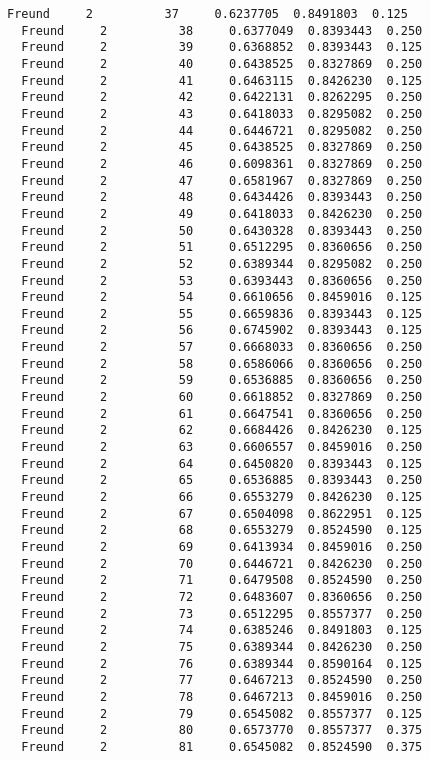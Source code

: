 \documentclass[11pt]{article}
\begin{document}
\begin{Verbatim}[commandchars=\\\{\}]
  Freund     2          37     0.6237705  0.8491803  0.125
  Freund     2          38     0.6377049  0.8393443  0.250
  Freund     2          39     0.6368852  0.8393443  0.125
  Freund     2          40     0.6438525  0.8327869  0.250
  Freund     2          41     0.6463115  0.8426230  0.125
  Freund     2          42     0.6422131  0.8262295  0.250
  Freund     2          43     0.6418033  0.8295082  0.250
  Freund     2          44     0.6446721  0.8295082  0.250
  Freund     2          45     0.6438525  0.8327869  0.250
  Freund     2          46     0.6098361  0.8327869  0.250
  Freund     2          47     0.6581967  0.8327869  0.250
  Freund     2          48     0.6434426  0.8393443  0.250
  Freund     2          49     0.6418033  0.8426230  0.250
  Freund     2          50     0.6430328  0.8393443  0.250
  Freund     2          51     0.6512295  0.8360656  0.250
  Freund     2          52     0.6389344  0.8295082  0.250
  Freund     2          53     0.6393443  0.8360656  0.250
  Freund     2          54     0.6610656  0.8459016  0.125
  Freund     2          55     0.6659836  0.8393443  0.125
  Freund     2          56     0.6745902  0.8393443  0.125
  Freund     2          57     0.6668033  0.8360656  0.250
  Freund     2          58     0.6586066  0.8360656  0.250
  Freund     2          59     0.6536885  0.8360656  0.250
  Freund     2          60     0.6618852  0.8327869  0.250
  Freund     2          61     0.6647541  0.8360656  0.250
  Freund     2          62     0.6684426  0.8426230  0.125
  Freund     2          63     0.6606557  0.8459016  0.250
  Freund     2          64     0.6450820  0.8393443  0.125
  Freund     2          65     0.6536885  0.8393443  0.250
  Freund     2          66     0.6553279  0.8426230  0.125
  Freund     2          67     0.6504098  0.8622951  0.125
  Freund     2          68     0.6553279  0.8524590  0.125
  Freund     2          69     0.6413934  0.8459016  0.250
  Freund     2          70     0.6446721  0.8426230  0.250
  Freund     2          71     0.6479508  0.8524590  0.250
  Freund     2          72     0.6483607  0.8360656  0.250
  Freund     2          73     0.6512295  0.8557377  0.250
  Freund     2          74     0.6385246  0.8491803  0.125
  Freund     2          75     0.6389344  0.8426230  0.250
  Freund     2          76     0.6389344  0.8590164  0.125
  Freund     2          77     0.6467213  0.8524590  0.250
  Freund     2          78     0.6467213  0.8459016  0.250
  Freund     2          79     0.6545082  0.8557377  0.125
  Freund     2          80     0.6573770  0.8557377  0.375
  Freund     2          81     0.6545082  0.8524590  0.375

\end{Verbatim}
\end{document}
